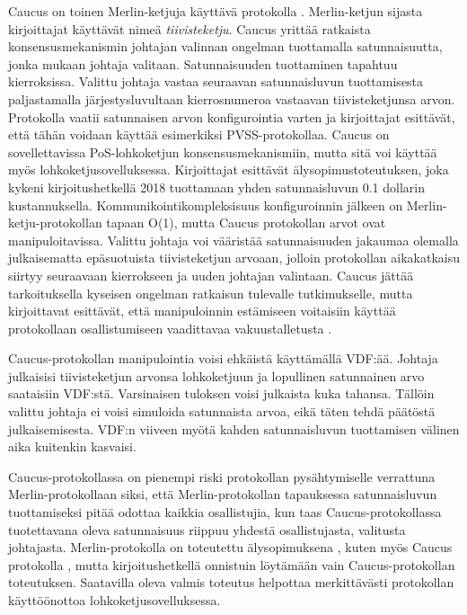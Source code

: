 Caucus on toinen Merlin-ketjuja käyttävä protokolla \cite{Caucus}. Merlin-ketjun sijasta kirjoittajat käyttävät nimeä \textit{tiivisteketju}. Caucus yrittää ratkaista konsensusmekanismin johtajan valinnan ongelman tuottamalla satunnaisuutta, jonka mukaan johtaja valitaan. Satunnaisuuden tuottaminen tapahtuu kierroksissa. Valittu johtaja vastaa seuraavan satunnaisluvun tuottamisesta paljastamalla järjestysluvultaan kierrosnumeroa vastaavan tiivisteketjunsa arvon. Protokolla vaatii satunnaisen arvon konfigurointia varten ja kirjoittajat esittävät, että tähän voidaan käyttää esimerkiksi PVSS-protokollaa. Caucus on sovellettavissa PoS-lohkoketjun konsensusmekanismiin, mutta sitä voi käyttää myös lohkoketjusovelluksessa. Kirjoittajat esittävät älysopimustoteutuksen, joka kykeni kirjoitushetkellä 2018 tuottamaan yhden satunnaisluvun 0.1 dollarin kustannuksella. Kommunikointikompleksisuus konfiguroinnin jälkeen on Merlin-ketju-protokollan tapaan O(1), mutta Caucus protokollan arvot ovat manipuloitavissa. Valittu johtaja voi vääristää satunnaisuuden jakaumaa olemalla julkaisematta epäsuotuista tiivisteketjun arvoaan, jolloin protokollan aikakatkaisu siirtyy seuraavaan kierrokseen ja uuden johtajan valintaan. Caucus jättää tarkoituksella kyseisen ongelman ratkaisun tulevalle tutkimukselle, mutta kirjoittavat esittävät, että manipuloinnin estämiseen voitaisiin käyttää protokollaan osallistumiseen vaadittavaa vakuustalletusta \cite{Caucus}.

Caucus-protokollan manipulointia voisi ehkäistä käyttämällä VDF:ää. Johtaja julkaisisi tiivisteketjun arvonsa lohkoketjuun ja lopullinen satunnainen arvo saataisiin VDF:stä. Varsinaisen tuloksen voisi julkaista kuka tahansa. Tällöin valittu johtaja ei voisi simuloida satunnaista arvoa, eikä täten tehdä päätöstä julkaisemisesta. VDF:n viiveen myötä kahden satunnaisluvun tuottamisen välinen aika kuitenkin kasvaisi.

Caucus-protokollassa on pienempi riski protokollan pysähtymiselle verrattuna Merlin-protokollaan siksi, että Merlin-protokollan tapauksessa satunnaisluvun tuottamiseksi pitää odottaa kaikkia osallistujia, kun taas Caucus-protokollassa tuotettavana oleva satunnaisuus riippuu yhdestä osallistujasta, valitusta johtajasta. Merlin-protokolla on toteutettu älysopimuksena  \cite{MerlinChains}, kuten myös Caucus protokolla \cite{Caucus}, mutta kirjoitushetkellä onnistuin löytämään vain Caucus-protokollan toteutuksen. Saatavilla oleva valmis toteutus helpottaa merkittävästi protokollan käyttöönottoa lohkoketjusovelluksessa.

